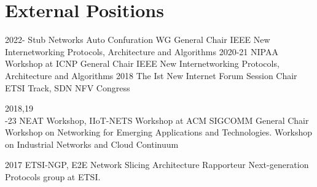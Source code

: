 \vspace{-0.8cm}
\section{External Positions}
\begin{entrylist}
	\entry
	{2022-}
	{Stub Networks Auto Confuration WG  } 
	{General Chair}
	{IEEE New Internetworking Protocols, Architecture and Algorithms}
\entry
{2020-21}
{NIPAA Workshop at ICNP} 
{General Chair}
{IEEE New Internetworking Protocols, Architecture and Algorithms}
\entry
{2018}
{The Ist New Internet Forum} 
{Session Chair}
{ETSI Track, SDN NFV Congress}

\entry
{2018,19\\-23}
{NEAT Workshop, IIoT-NETS Workshop at ACM SIGCOMM} 
{General Chair}
{Workshop on Networking for Emerging Applications and Technologies. Workshop on Industrial Networks and Cloud Continuum}

\entry
{2017}
{ETSI-NGP, E2E Network Slicing Architecture} 
{Rapporteur}
{Next-generation Protocols group at ETSI.}
\end{entrylist}


